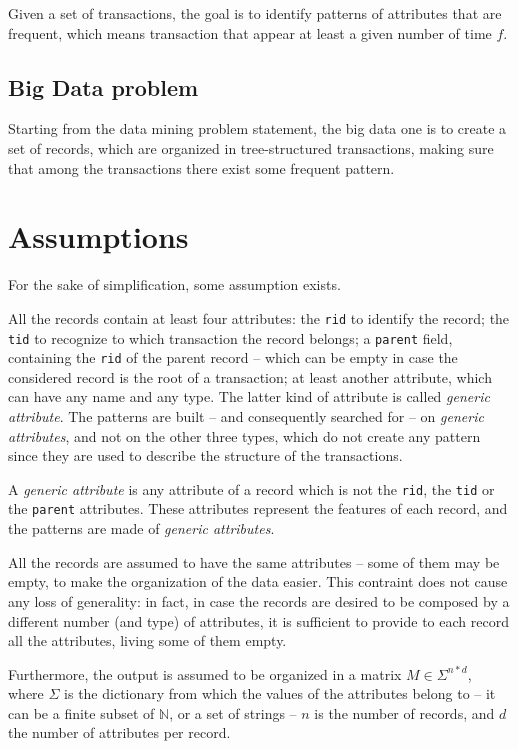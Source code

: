 \documentclass{acm_proc_article-sp-sigmod09}
\begin{document}
Given a set of transactions, the goal is to identify patterns of attributes that are frequent, which means transaction that appear at least a given number of time $f$.

\subsection{Big Data problem}
Starting from the data mining problem statement, the big data one is to create a set of records, which are organized in tree-structured transactions, making sure that among the transactions there exist some frequent pattern.

\section{Assumptions}
\label{sec:assumptions}
For the sake of simplification, some assumption exists.

All the records contain at least four attributes: the \texttt{rid} to identify the record; the \texttt{tid} to recognize to which transaction the record belongs; a \texttt{parent} field, containing the \texttt{rid} of the parent record -- which can be empty in case the considered record is the root of a transaction; at least another attribute, which can have any name and any type. The latter kind of attribute is called \emph{generic attribute}. The patterns are built -- and consequently searched for -- on \emph{generic attributes}, and not on the other three types, which do not create any pattern since they are used to describe the structure of the transactions.

\begin{definition}
A \emph{generic attribute} is any attribute of a record which is not the \texttt{rid}, the \texttt{tid} or the \texttt{parent} attributes. These attributes represent the features of each record, and the patterns are made of \emph{generic attributes}.
\end{definition}

All the records are assumed to have the same attributes -- some of them may be empty, to make the organization of the data easier. This contraint does not cause any loss of generality: in fact, in case the records are desired to be composed by a different number (and type) of attributes, it is sufficient to provide to each record all the attributes, living some of them empty. 

Furthermore, the output is assumed to be organized in a matrix $M \in \Sigma^{n * d}$, where $\Sigma$ is the dictionary from which the values of the attributes belong to -- it can be a finite subset of $\mathbb{N}$, or a set of strings -- $n$ is the number of records, and $d$ the number of attributes per record.
\end{document}
